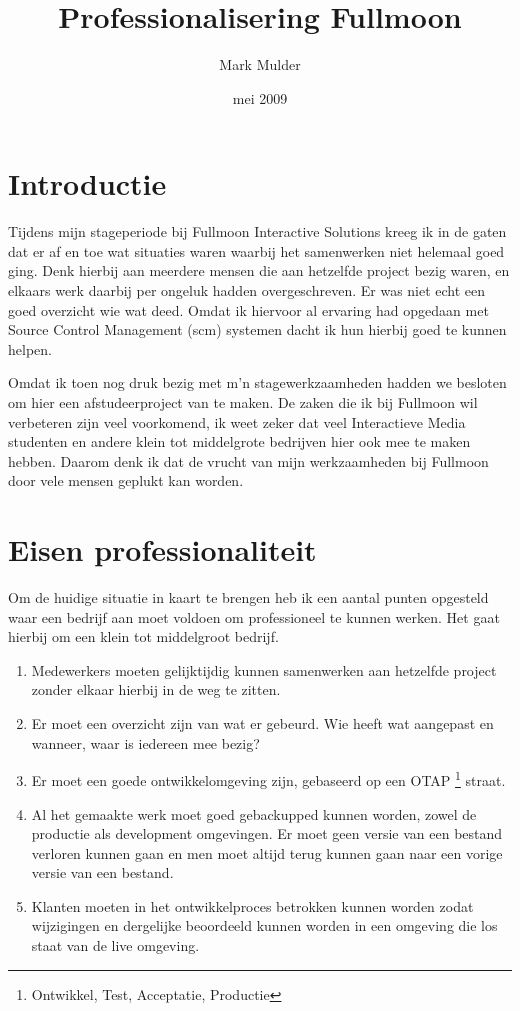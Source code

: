 \documentclass[12pt,a4paper]{article}
\title{Professionalisering Fullmoon}
\author{Mark Mulder}
\date{mei 2009}
\begin{document}
  
  \maketitle
  \pagebreak
  
  \tableofcontents  
  \pagebreak
  
  \section{Introductie}

  Tijdens mijn stageperiode bij Fullmoon Interactive Solutions kreeg ik in de gaten dat er af en toe wat situaties waren waarbij het samenwerken niet helemaal goed ging. Denk hierbij aan meerdere mensen die aan hetzelfde project bezig waren, en elkaars werk daarbij per ongeluk hadden overgeschreven. Er was niet echt een goed overzicht wie wat deed. Omdat ik hiervoor al ervaring had opgedaan met Source Control Management {\sc (scm)} systemen dacht ik hun hierbij goed te kunnen helpen.
    
    Omdat ik toen nog druk bezig met m'n stagewerkzaamheden hadden we besloten om hier een afstudeerproject van te maken. De zaken die ik bij Fullmoon wil verbeteren zijn veel voorkomend, ik weet zeker dat veel Interactieve Media studenten en andere klein tot middelgrote bedrijven hier ook mee te maken hebben. Daarom denk ik dat de vrucht van mijn werkzaamheden bij Fullmoon door vele mensen geplukt kan worden.
    
  \section{Eisen professionaliteit}

  Om de huidige situatie in kaart te brengen heb ik een aantal punten opgesteld waar een bedrijf aan moet voldoen om professioneel te kunnen werken. Het gaat hierbij om een klein tot middelgroot bedrijf.

  \begin{enumerate}
    \item Medewerkers moeten gelijktijdig kunnen samenwerken aan hetzelfde project zonder elkaar hierbij in de weg te zitten.
    \item Er moet een overzicht zijn van wat er gebeurd. Wie heeft wat aangepast en wanneer, waar is iedereen mee bezig?
    \item Er moet een goede ontwikkelomgeving zijn, gebaseerd op een OTAP \footnote{Ontwikkel, Test, Acceptatie, Productie} straat.
    \item Al het gemaakte werk moet goed gebackupped kunnen worden, zowel de productie als development omgevingen. Er moet geen versie van een bestand verloren kunnen gaan en men moet altijd terug kunnen gaan naar een vorige versie van een bestand.
    \item Klanten moeten in het ontwikkelproces betrokken kunnen worden zodat wijzigingen en dergelijke beoordeeld kunnen worden in een omgeving die los staat van de live omgeving.
  \end{enumerate}
\end{document}
